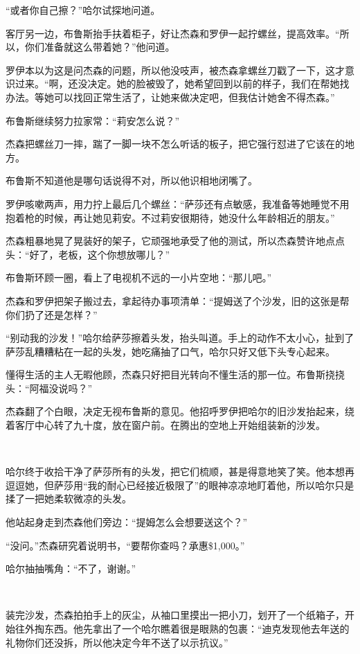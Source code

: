 \documentclass[../main]{subfiles}
\begin{document}
“或者你自己擦？”哈尔试探地问道。

客厅另一边，布鲁斯抬手扶着柜子，好让杰森和罗伊一起拧螺丝，提高效率。“所以，你们准备就这么带着她？”他问道。

罗伊本以为这是问杰森的问题，所以他没吱声，被杰森拿螺丝刀戳了一下，这才意识过来。“啊，还没决定。她的脸被毁了，她希望回到以前的样子，我们在帮她找办法。等她可以找回正常生活了，让她来做决定吧，但我估计她舍不得杰森。”

布鲁斯继续努力拉家常：“莉安怎么说？”

杰森把螺丝刀一摔，踹了一脚一块不怎么听话的板子，把它强行怼进了它该在的地方。

布鲁斯不知道他是哪句话说得不对，所以他识相地闭嘴了。

罗伊咳嗽两声，用力拧上最后几个螺丝：“萨莎还有点敏感，我准备等她睡觉不用抱着枪的时候，再让她见莉安。不过莉安很期待，她没什么年龄相近的朋友。”

杰森粗暴地晃了晃装好的架子，它顽强地承受了他的测试，所以杰森赞许地点点头：“好了，老板，这个你想放哪儿？”

布鲁斯环顾一圈，看上了电视机不远的一小片空地：“那儿吧。”

杰森和罗伊把架子搬过去，拿起待办事项清单：“提姆送了个沙发，旧的这张是帮你们扔了还是怎样？”

“别动我的沙发！”哈尔给萨莎擦着头发，抬头叫道。手上的动作不太小心，扯到了萨莎乱糟糟粘在一起的头发，她吃痛抽了口气，哈尔只好又低下头专心起来。

懂得生活的主人无暇他顾，杰森只好把目光转向不懂生活的那一位。布鲁斯挠挠头：“阿福没说吗？”

杰森翻了个白眼，决定无视布鲁斯的意见。他招呼罗伊把哈尔的旧沙发抬起来，绕着客厅中心转了九十度，放在窗户前。在腾出的空地上开始组装新的沙发。

~\

哈尔终于收拾干净了萨莎所有的头发，把它们梳顺，甚是得意地笑了笑。他本想再逗逗她，但萨莎用“我的耐心已经接近极限了”的眼神凉凉地盯着他，所以哈尔只是揉了一把她柔软微凉的头发。

他站起身走到杰森他们旁边：“提姆怎么会想要送这个？”

“没问。”杰森研究着说明书，“要帮你查吗？承惠\$1,000。”

哈尔抽抽嘴角：“不了，谢谢。”

~\

装完沙发，杰森拍拍手上的灰尘，从袖口里摸出一把小刀，划开了一个纸箱子，开始往外掏东西。他先拿出了一个哈尔瞧着很是眼熟的包裹：“迪克发现他去年送的礼物你们还没拆，所以他决定今年不送了以示抗议。”
\end{document}
